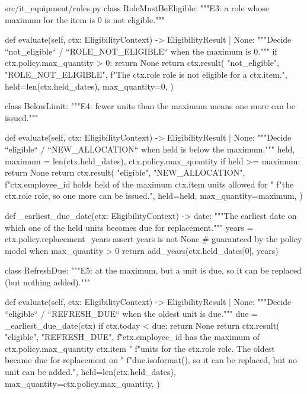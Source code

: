 \documentclass[11pt,letterpaper]{article}
\renewcommand{\_}{\textunderscore\allowbreak}
\begin{document}
\begin{codebox}{src/it_equipment/rules.py}
class RoleMustBeEligible:
    """E3: a role whose maximum for the item is 0 is not eligible."""

    def evaluate(self, ctx: EligibilityContext) -> EligibilityResult | None:
        """Decide ``not_eligible`` / ``ROLE_NOT_ELIGIBLE`` when the maximum is 0."""
        if ctx.policy.max_quantity > 0:
            return None
        return ctx.result(
            "not_eligible",
            "ROLE_NOT_ELIGIBLE",
            f"The {ctx.role} role is not eligible for a {ctx.item}.",
            held=len(ctx.held_dates),
            max_quantity=0,
        )


class BelowLimit:
    """E4: fewer units than the maximum means one more can be issued."""

    def evaluate(self, ctx: EligibilityContext) -> EligibilityResult | None:
        """Decide ``eligible`` / ``NEW_ALLOCATION`` when held is below the maximum."""
        held, maximum = len(ctx.held_dates), ctx.policy.max_quantity
        if held >= maximum:
            return None
        return ctx.result(
            "eligible",
            "NEW_ALLOCATION",
            f"{ctx.employee_id} holds {held} of the {maximum} {ctx.item} units allowed for "
            f"the {ctx.role} role, so one more can be issued.",
            held=held,
            max_quantity=maximum,
        )


def _earliest_due_date(ctx: EligibilityContext) -> date:
    """The earliest date on which one of the held units becomes due for replacement."""
    years = ctx.policy.replacement_years
    assert years is not None  # guaranteed by the policy model when max_quantity > 0
    return add_years(ctx.held_dates[0], years)


class RefreshDue:
    """E5: at the maximum, but a unit is due, so it can be replaced (but nothing added)."""

    def evaluate(self, ctx: EligibilityContext) -> EligibilityResult | None:
        """Decide ``eligible`` / ``REFRESH_DUE`` when the oldest unit is due."""
        due = _earliest_due_date(ctx)
        if ctx.today < due:
            return None
        return ctx.result(
            "eligible",
            "REFRESH_DUE",
            f"{ctx.employee_id} has the maximum of {ctx.policy.max_quantity} {ctx.item} "
            f"units for the {ctx.role} role. The oldest became due for replacement on "
            f"{due.isoformat()}, so it can be replaced, but no unit can be added.",
            held=len(ctx.held_dates),
            max_quantity=ctx.policy.max_quantity,
        )



\end{codebox}
\end{document}
